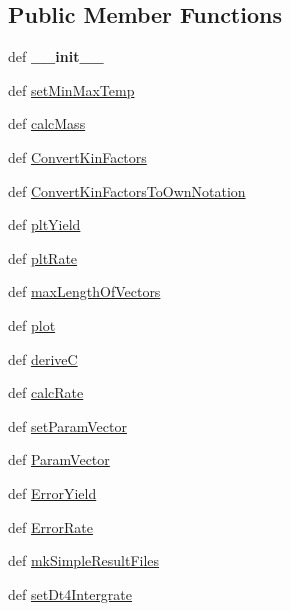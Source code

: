 \subsection*{\-Public \-Member \-Functions}
\begin{DoxyCompactItemize}
\item 
\hypertarget{classModels_1_1ArrheniusModelAlternativeNotation2_a31e5d19d4c8a3a40e443bda85b5a9ca3}{def {\bfseries \-\_\-\-\_\-init\-\_\-\-\_\-}}\label{classModels_1_1ArrheniusModelAlternativeNotation2_a31e5d19d4c8a3a40e443bda85b5a9ca3}

\item 
def \hyperlink{classModels_1_1ArrheniusModelAlternativeNotation2_aec47f44b01fdbf818fe5839a8c7c17f4}{set\-Min\-Max\-Temp}
\item 
def \hyperlink{classModels_1_1ArrheniusModelAlternativeNotation2_afe70c590fc443e5d91a51485089c513f}{calc\-Mass}
\item 
def \hyperlink{classModels_1_1ArrheniusModelAlternativeNotation2_a82aa3ccadb987ed778dde97edaf5b687}{\-Convert\-Kin\-Factors}
\item 
def \hyperlink{classModels_1_1ArrheniusModelAlternativeNotation2_aca4ecfb8e8796868adc871488d5932c4}{\-Convert\-Kin\-Factors\-To\-Own\-Notation}
\item 
def \hyperlink{classModels_1_1Model_a317ed848b969dbe3a96dd05e8b771900}{plt\-Yield}
\item 
def \hyperlink{classModels_1_1Model_aa35c741babf8f141df48c4021e0664e4}{plt\-Rate}
\item 
def \hyperlink{classModels_1_1Model_a3396d6ca1a7b7d66e55ada8c3c7a509e}{max\-Length\-Of\-Vectors}
\item 
def \hyperlink{classModels_1_1Model_ae404a691e48bfe4eafcdfdd09f1dae48}{plot}
\item 
def \hyperlink{classModels_1_1Model_a010945ed2adff59a7a5fce36025e7a97}{derive\-C}
\item 
def \hyperlink{classModels_1_1Model_a7c9280e33f9e0d46703cebc131008c65}{calc\-Rate}
\item 
def \hyperlink{classModels_1_1Model_a818f207e2a4bd0e9a3720ca611960e5a}{set\-Param\-Vector}
\item 
def \hyperlink{classModels_1_1Model_a13c76a0fe24d43cdc4d21fbc73fa96fa}{\-Param\-Vector}
\item 
def \hyperlink{classModels_1_1Model_ad3e627980d9e781bf7b2c9ff900ca06b}{\-Error\-Yield}
\item 
def \hyperlink{classModels_1_1Model_a3050eb39341f318d8d88b172f88bd240}{\-Error\-Rate}
\item 
def \hyperlink{classModels_1_1Model_adcb987bccae63a742490ea1e6d5f7a74}{mk\-Simple\-Result\-Files}
\item 
def \hyperlink{classModels_1_1Model_ac28252ae5cd6b5ecd4c5d006a0e6567d}{set\-Dt4\-Intergrate}
\end{DoxyCompactItemize}
